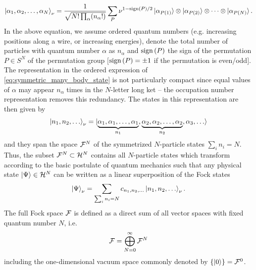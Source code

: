 \begin{align}
    \ket{\alpha_1,\alpha_2,\dots,\alpha_N}_\nu = \frac1{\sqrt{N!\prod_{\alpha}(n_\alpha!)}}\sum_P \nu^{1-\text{sign}\left( P \right)/2}\ket{\alpha_{P(1)}}\otimes\ket{\alpha_{P(2)}}\otimes\dots\otimes\ket{\alpha_{P(N)}}.
    \label{eq:symmetric_many_body_state}
\end{align}
In the above equation, we assume ordered quantum numbers (e.g. increasing positions along a wire, or increasing energies), denote the total number of particles with quantum number $\alpha$ as $n_\alpha$ and $\text{sign}\left( P \right)$ the sign of the permutation $P\in S^N$ of the permutation group [$\text{sign}\left( P \right)=\pm1$ if the permutation is even/odd].
\\

The representation in the ordered expression of \cref{eq:symmetric_many_body_state} is not particularly compact since equal values of $\alpha$ may appear $n_\alpha$ times in the $N$-letter long ket -- the occupation number representation removes this redundancy.
The states in this representation are then given by
\begin{align}
    \ket{n_1, n_2, \dots}_\nu = \ket{\underbrace{\alpha_1,\alpha_1,\dots,\alpha_1}_{n_1}, \underbrace{\alpha_2, \alpha_2,\dots, \alpha_2}_{n_2}, \alpha_3, \dots}
\end{align}
and they span the space $\mathcal{F}^N$ of the symmetrized $N$-particle states $\sum_{i} n_i = N$.
Thus, the subset $\mathcal{F}^N\subset \mathcal{H}^N$ contains all $N$-particle states which transform according to the basic postulate of quantum mechanics such that any physical state $\ket{\Psi}\in\mathcal{H}^N$ can be written as a linear superposition of the Fock states
\begin{align}
    \ket{\Psi}_\nu = \sum_{\sum_i n_i = N}c_{n_1,n_2,\dots}\ket{n_1,n_2,\dots}_\nu.
\end{align}
The full Fock space $\mathcal{F}$ is defined as a direct sum of all vector spaces with fixed quantum number $N$, i.e.
\begin{align}
    \mathcal{F} = \bigoplus_{N=0}^\infty \mathcal{F}^N
\end{align}
including the one-dimensional vacuum space commonly denoted by $\{\ket{0}\}=\mathcal{F}^0$.
\\

